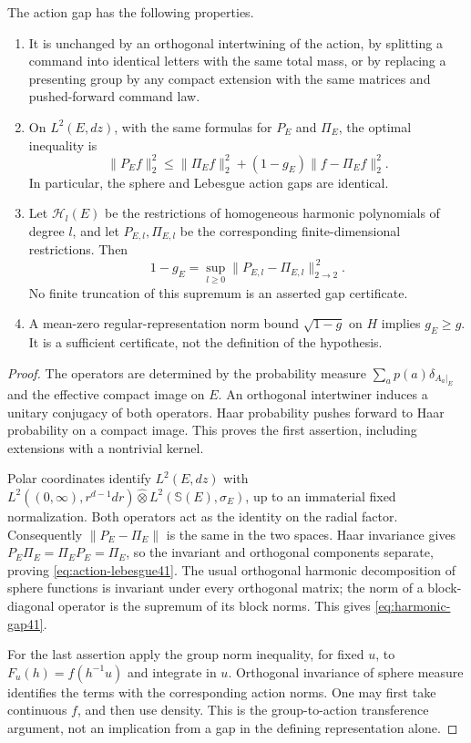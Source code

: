 \begin{proposition}
\label{prop:action41}
The action gap has the following properties.
\begin{enumerate}
\item It is unchanged by an orthogonal intertwining of the action, by
splitting a command into identical letters with the same total mass, or
by replacing a presenting group by any compact extension with the same
matrices and pushed-forward command law.
\item On $L^2(E,dz)$, with the same formulas for $P_E$ and $\Pi_E$, the
optimal inequality is
\begin{equation}\label{eq:action-lebesgue41}
 \|P_Ef\|_2^2\le\|\Pi_Ef\|_2^2+(1-g_E)\|f-\Pi_Ef\|_2^2.
\end{equation}
In particular, the sphere and Lebesgue action gaps are identical.
\item Let $\mathcal H_l(E)$ be the restrictions of homogeneous harmonic
polynomials of degree $l$, and let $P_{E,l},\Pi_{E,l}$ be the corresponding
finite-dimensional restrictions. Then
\begin{equation}\label{eq:harmonic-gap41}
 1-g_E=\sup_{l\ge0}\|P_{E,l}-\Pi_{E,l}\|_{2\to2}^{\,2}.
\end{equation}
No finite truncation of this supremum is an asserted gap certificate.
\item A mean-zero regular-representation norm bound $\sqrt{1-g}$ on $H$
implies $g_E\ge g$. It is a sufficient certificate, not the definition
of the hypothesis.
\end{enumerate}
\end{proposition}
\begin{proof}
The operators are determined by the probability measure
$\sum_a p(a)\delta_{A_a|_E}$ and the effective compact image on $E$.
An orthogonal intertwiner induces a unitary conjugacy of both operators.
Haar probability pushes forward to Haar probability on a compact image.
This proves the first assertion, including extensions with a nontrivial
kernel.

Polar coordinates identify $L^2(E,dz)$ with
$L^2((0,\infty),r^{d-1}dr)\mathbin{\widehat\otimes}
L^2(\mathbb S(E),\sigma_E)$, up to an immaterial fixed normalization.
Both operators act as the identity on the radial factor. Consequently
$\|P_E-\Pi_E\|$ is the same in the two spaces. Haar invariance gives
$P_E\Pi_E=\Pi_EP_E=\Pi_E$, so the invariant and orthogonal components
separate, proving \eqref{eq:action-lebesgue41}. The usual orthogonal
harmonic decomposition of sphere functions is invariant under every
orthogonal matrix; the norm of a block-diagonal operator is the supremum
of its block norms. This gives \eqref{eq:harmonic-gap41}.

For the last assertion apply the group norm inequality, for fixed $u$,
to $F_u(h)=f(h^{-1}u)$ and integrate in $u$. Orthogonal invariance of
sphere measure identifies the terms with the corresponding action
norms. One may first take continuous $f$, and then use density. This is
the group-to-action transference argument, not an implication from a
gap in the defining representation alone.
\end{proof}

